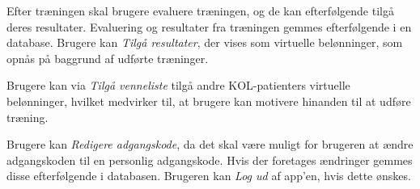 Efter træningen skal brugere evaluere træningen, og de kan efterfølgende tilgå deres  resultater. Evaluering og resultater fra træningen gemmes efterfølgende i en database. Brugere kan \textit{Tilgå resultater}, der vises som virtuelle belønninger, som opnås på baggrund af udførte træninger. 

Brugere kan via \textit{Tilgå venneliste} tilgå andre KOL-patienters virtuelle belønninger, hvilket medvirker til, at brugere kan motivere hinanden til at udføre træning. 

Brugere kan \textit{Redigere adgangskode}, da det skal være muligt for brugeren at ændre adgangskoden til en personlig adgangskode. Hvis der foretages ændringer gemmes disse efterfølgende i databasen.
Brugeren kan \textit{Log ud} af app'en, hvis dette ønskes. 

%
%
%
%
